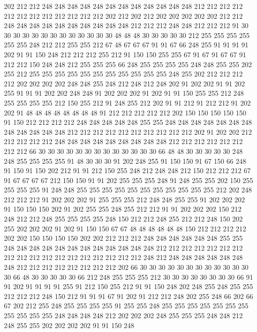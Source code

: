 202 212 212 248 248 248 248 248 248 248 248 248 248 248 248 212 212 212 212 212
212 212 212 212 212 212 212 202 212 202 212 202 202 202 202 202 212 212 248 248
248 248 248 248 248 248 248 248 212 212 212 248 248 212 212 212 91 30 30 30
30 30 30 30 30 30 30 30 30 30 48 48 48 30 30 30 30 30 212 255
255 255 255 255 255 248 212 212 255 255 212 67 48 67 67 67 91 91 67 66
248 255 91 91 91 91 202 91 91 150 248 212 212 212 255 212 91 150 150 255
255 67 91 67 91 67 67 91 212 212 150 248 248 212 255 255 255 66 248 255
255 255 255 248 248 255 255 202 255 212 255 255 255 255 255 255 255 255 255 255
255 248 255 202 212 212 212 212 202 202 202 202 248 248 255 248 212 248 212 248
202 91 202 202 91 91 202 255 91 91 91 202 202 248 248 91 202 202 202 91
202 91 91 150 255 255 212 248 255 255 255 255 212 150 255 212 91 248 255 212
202 91 91 212 91 212 212 91 202 202 91 48 48 48 48 48 48 48 48 91
212 212 212 212 212 202 150 150 150 150 150 91 150 212 212 212 212 248 248 248
248 248 255 255 248 248 248 248 248 248 248 248 248 248 248 248 212 212 212 212
212 212 212 212 212 212 202 91 202 202 212 212 212 212 212 248 248 248 248 248
248 248 248 248 212 212 212 212 212 212 212 212 66 30 30 30 30 30 30 30
30 30 30 30 30 30 66 48 48 30 30 30 30 30 248 248 255 255 255 255
91 48 30 30 30 91 202 248 255 91 150 150 91 67 150 66 248 91 150 91
150 202 212 91 91 212 150 255 248 212 248 248 212 150 212 212 212 67 91 67
67 67 67 212 150 150 91 91 202 255 255 255 248 91 248 255 255 202 150 255
255 255 255 91 248 248 255 255 255 255 255 255 255 255 255 255 255 212 202 248
212 212 212 91 202 202 202 91 255 255 255 212 248 248 255 255 91 202 202 202
91 150 150 150 202 91 202 255 255 248 255 212 212 91 91 202 202 202 150 212
248 212 212 248 255 255 255 255 248 150 212 212 248 255 212 212 248 150 202 255
202 202 202 91 202 91 150 150 67 67 48 48 48 48 48 48 150 212 212 212
212 202 202 150 150 150 150 202 202 212 212 212 248 248 248 248 248 248 255 255
248 248 248 248 248 248 248 248 248 248 248 248 212 212 212 212 212 212 212 212
212 212 212 212 212 212 212 212 212 212 248 212 248 248 248 248 248 248 248 212
212 212 212 212 212 212 212 202 66 30 30 30 30 30 30 30 30 30 30 30
30 30 66 48 30 30 30 30 30 66 212 248 255 255 255 212 30 30 30 30
30 30 30 30 66 91 91 202 91 91 91 91 255 91 212 150 255 212 91 91
150 248 202 248 255 248 255 255 212 212 212 248 150 212 91 91 91 67 91 202
91 212 212 248 202 255 248 66 202 66 67 202 212 255 248 255 255 255 255 91
255 255 248 255 255 255 255 255 255 255 255 255 255 255 248 248 248 248 212 202
202 202 248 255 255 255 248 248 212 248 255 255 202 202 202 202 91 91 150 248
